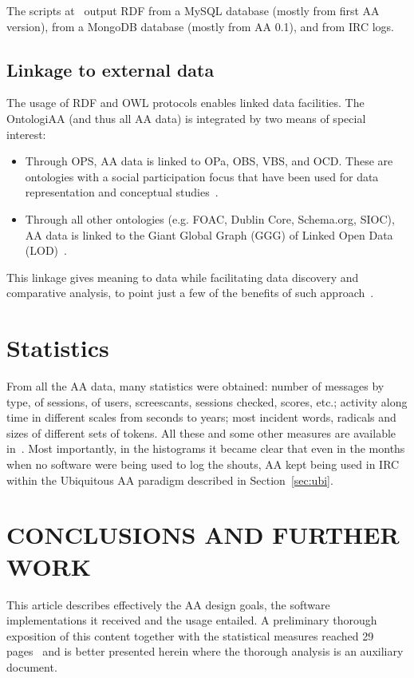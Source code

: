 \documentclass[12pt,fleqn]{article}
\begin{document}
The scripts at~\cite{participation} output RDF from a MySQL database (mostly from first AA version),
from a MongoDB database (mostly from AA 0.1),
and from IRC logs.

\subsection{Linkage to external data}
The usage of RDF and OWL protocols enables linked data facilities.
The OntologiAA (and thus all AA data) is integrated by two means of special interest:
\begin{itemize}
    \item Through OPS, AA data is linked to OPa, OBS, VBS, and OCD.
	    These are ontologies
		with a social participation focus
		that have been used for data representation and conceptual studies~\citep{pnud5}.
    \item Through all other ontologies (e.g. FOAC, Dublin Core, Schema.org, SIOC),
	    AA data is linked to the Giant Global Graph (GGG) of Linked Open Data (LOD)~\citep{LOD,losd}.
\end{itemize}

This linkage gives meaning to data while facilitating data discovery and comparative analysis,
to point just a few of the benefits of such approach~\citep{ldb}.

\section{Statistics}\label{sec:stats}
From all the AA data, many statistics were obtained:
number of messages by type, of sessions, of users, screescants, sessions checked, scores, etc.;
activity along time in different scales from seconds to years;
most incident words, radicals and sizes of different sets of tokens.
All these and some other measures are available in~\cite{ensaaio}.
Most importantly, in the histograms it became clear that even in the months when no
software were being used to log the shouts, AA kept being used in IRC
within the Ubiquitous AA paradigm described in Section~\ref{sec:ubi}.

\section{CONCLUSIONS AND FURTHER WORK}\label{sec:conc}
This article describes effectively the AA design goals, the software implementations
it received and the usage entailed.
A preliminary thorough exposition of this content together with the statistical measures
reached 29 pages~\citep{ensaaio} and is better presented herein where the thorough analysis
is an auxiliary document.
\end{document}
